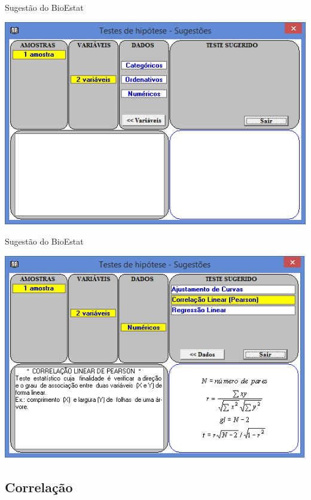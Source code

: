 \documentclass{beamer}
\begin{document}
\begin{frame}{Sugestão do BioEstat}
  \begin{center}
    \includegraphics[height=0.9\textheight]{Pratica_Assoc/sugestao3}
  \end{center}
\end{frame}

\begin{frame}{Sugestão do BioEstat}
  \begin{center}
    \includegraphics[height=0.9\textheight]{Pratica_Assoc/sugestao4}
  \end{center}
\end{frame}

\subsection{Correlação}
\end{document}

